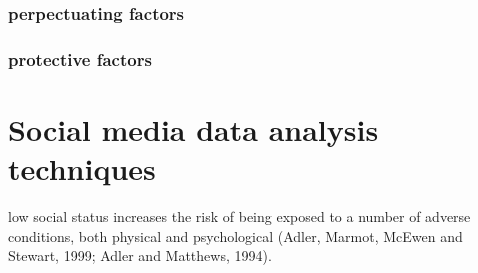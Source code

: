 \subsubsection{perpectuating factors}


\subsubsection{protective factors}





\section{Social media data analysis techniques}

low social status increases the risk of being exposed to a number of adverse conditions, both physical and psychological (Adler, Marmot, McEwen and Stewart, 1999; Adler and Matthews, 1994). 











